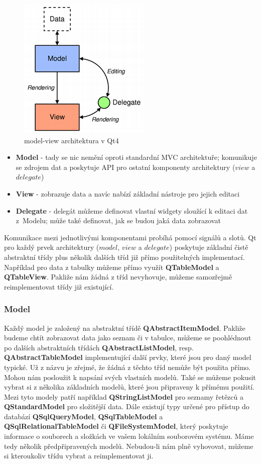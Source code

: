 \begin{figure}[h]
	\centering
	\includegraphics[scale=0.7]{pictures/qt/mv}
	\caption{model-view architektura v Qt4}
	\label{mvc}
\end{figure}

\begin{itemize}
	\item{\textbf{Model}} - tady se nic nemění oproti standardní MVC architektuře; komunikuje se zdrojem dat a poskytuje API pro ostatní komponenty architektury ($view$ a $delegate$)
	\item{\textbf{View}} - zobrazuje data a navíc nabízí základní nástroje pro jejich editaci
	\item{\textbf{Delegate}} - delegát můžeme definovat vlastní widgety sloužící k editaci dat z~Modelu; může také definovat, jak se budou jaká data zobrazovat
\end{itemize}

Komunikace mezi jednotlivými komponentami probíhá pomocí signálů a slotů. Qt pro každý prvek architektury ($model$, $view$ a $delegate$) poskytuje základní čistě abstraktní třídy plus několik dalších tříd již přímo použitelných implementací. Například pro data z tabulky můžeme přímo využít \textbf{QTableModel} a \textbf{QTableView}. Pakliže nám žádná z tříd nevyhovuje, můžeme samozřejmě reimplementovat třídy již existující.

\subsubsection*{Model}
Každý model je založený na abstraktní třídě \textbf{QAbstractItemModel}. Pakliže budeme chtít zobrazovat data jako seznam či v tabulce, můžeme se poohlédnout po dalších abstraktních třídách \textbf{QAbstractListModel}, resp. \textbf{QAbstractTableModel} implementující další prvky, které jsou pro daný model typické. Už z názvu je zřejmé, že žádná z těchto tříd nemůže být použita přímo. Mohou nám posloužit k napsání svých vlastních modelů. Také se můžeme pokusit vybrat si z několika základních modelů, které jsou připraveny k přímému použití. Mezi tyto modely patří například \textbf{QStringListModel} pro seznamy řetězců a \textbf{QStandardModel} pro složitější data. Dále existují typy určené pro přístup do databází \textbf{QSqlQueryModel}, \textbf{QSqlTableModel} a \textbf{QSqlRelationalTableModel} či \textbf{QFileSystemModel}, který poskytuje informace o souborech a složkách ve vašem lokálním souborovém systému. Máme tedy několik předpřipravených modelů. Nebudou-li nám plně vyhovovat, můžeme si kteroukoliv třídu vybrat a reimplementovat ji.

